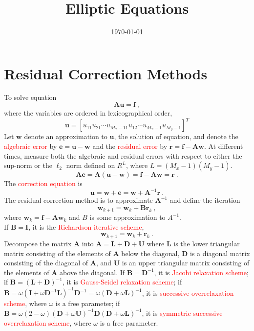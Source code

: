 \documentclass[12pt,a4paper]{article}
\title{Elliptic Equations}
\author{}
\date{\today}
\renewcommand{\vec}[1]{\boldsymbol{#1}}
\begin{document}
\maketitle




\section{Residual Correction Methods}
To solve equation 
\begin{equation}
\vec{A}  \vec{u} = \vec{f} ~, 
\label{matrix_equ}
\end{equation}
where the variables are ordered in lexicographical order,
\begin{equation*}
\vec{u} = [u_{11}u_{21}\cdots u_{M_x-11} u_{12} \cdots u_{M_x-1}u_{M_y-1} ]^T
\end{equation*}
Let $\vec{w}$ denote an approximation to $\vec{u}$, the solution of equation, and denote the \textcolor{red}{algebraic error} by $\vec{e} = \vec{u} - \vec{w}$ and the \textcolor{red}{residual error} by $\vec{r} = \vec{f}- \vec{A}\vec{w}$. At different times, measure both the algebraic and residual errors with respect to either the sup-norm or the $\ell_2$ norm defined on $R^L$, where $L = (M_x- 1)(M_y- 1)$.
\begin{equation}
\vec{A}  \vec{e} = \vec{A} (\vec{u} - \vec{w}) = \vec{f} - \vec{A} \vec{w} = \vec{r} ~.
\end{equation}
The \textcolor{red}{correction equation} is
\begin{equation}
\vec{u} = \vec{w} +\vec{e} = \vec{w} + \vec{A}^{-1} \vec{r} ~.
\end{equation}
The residual correction method is to approximate $\vec{A}^{-1}$ and define the iteration
\begin{equation}
\vec{w}_{k+1} = \vec{w}_k +\vec{B} \vec{r}_k ~,
\label{iter_sche}
\end{equation}
where $\vec{w}_k = \vec{f}- \vec{A} \vec{w}_k$ and $B$ is some approximation to $A^{-1}$. \\
If $\vec{B} = \vec{I}$, it is the \textcolor{red}{Richardson iterative scheme},
\begin{equation}
\vec{w}_{k+1} = \vec{w}_k +  \vec{r}_k ~.
\end{equation}
Decompose the matrix $\vec{A}$ into $\vec{A} = \vec{L} +\vec{D} +\vec{U}$ where $\vec{L}$ is the lower triangular matrix consisting of the elements of $\vec{A}$ below the diagonal, $\vec{D}$ is a diagonal matrix consisting of the diagonal of $\vec{A}$, and $\vec{U}$ is an upper triangular matrix consisting of the elements of $\vec{A}$ above the diagonal. If $\vec{B} = \vec{D}^{-1}$, it is \textcolor{red}{Jacobi relaxation scheme}; if $\vec{B} = (\vec{L} +\vec{D})^{-1}$, it is \textcolor{red}{Gauss-Seidel relaxation scheme}; if $\vec{B} = \omega(\vec{I} +\omega\vec{D}^{-1}\vec{L})^{-1} \vec{D}^{-1} = \omega (\vec{D} +\omega \vec{L})^{-1}$, it is \textcolor{red}{successive overrelaxation scheme}, where $\omega$ is a free parameter; if $\vec{B} = \omega(2-\omega)(\vec{D} +\omega\vec{U})^{-1}\vec{D}(\vec{D} +\omega \vec{L})^{-1}$, it is \textcolor{red}{symmetric successive overrelaxation scheme}, where $\omega$ is a free parameter.
\end{document}
